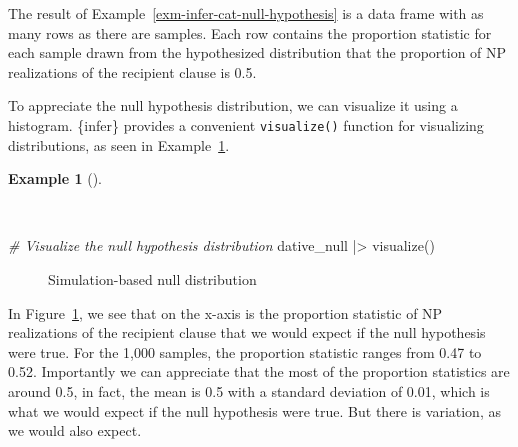 \documentclass[
  letterpaper,
]{latex/krantz}
\newenvironment{Shaded}{\begin{snugshade}}{\end{snugshade}}
\newcommand{\CommentTok}[1]{\textcolor[rgb]{0.00,0.00,0.00}{\textit{#1}}}
\newcommand{\FunctionTok}[1]{\textcolor[rgb]{0.00,0.00,0.00}{#1}}
\newcommand{\NormalTok}[1]{\textcolor[rgb]{0.00,0.00,0.00}{#1}}
\newcommand{\SpecialCharTok}[1]{\textcolor[rgb]{0.00,0.00,0.00}{#1}}
\theoremstyle{definition}
\newtheorem{example}{Example}[chapter]
\theoremstyle{remark}
\begin{document}
The result of Example~\ref{exm-infer-cat-null-hypothesis} is a data
frame with as many rows as there are samples. Each row contains the
proportion statistic for each sample drawn from the hypothesized
distribution that the proportion of NP realizations of the recipient
clause is 0.5.

To appreciate the null hypothesis distribution, we can visualize it
using a histogram. \{infer\} provides a convenient \texttt{visualize()}
function for visualizing distributions, as seen in
Example~\ref{exm-infer-cat-null-hypothesis-vis}.

\begin{example}[]\protect\hypertarget{exm-infer-cat-null-hypothesis-vis}{}\label{exm-infer-cat-null-hypothesis-vis}

~

\begin{Shaded}
\begin{Highlighting}[]
\CommentTok{\# Visualize the null hypothesis distribution}
\NormalTok{dative\_null }\SpecialCharTok{|\textgreater{}} \FunctionTok{visualize}\NormalTok{()}
\end{Highlighting}
\end{Shaded}

\begin{figure}[!htb]


\caption{\label{fig-infer-cat-null-hypothesis}Simulation-based null
distribution}

\end{figure}%

\end{example}

In Figure~\ref{fig-infer-cat-null-hypothesis}, we see that on the x-axis
is the proportion statistic of NP realizations of the recipient clause
that we would expect if the null hypothesis were true. For the 1,000
samples, the proportion statistic ranges from 0.47 to 0.52. Importantly
we can appreciate that the most of the proportion statistics are around
0.5, in fact, the mean is 0.5 with a standard deviation of 0.01, which
is what we would expect if the null hypothesis were true. But there is
variation, as we would also expect.
\end{document}
